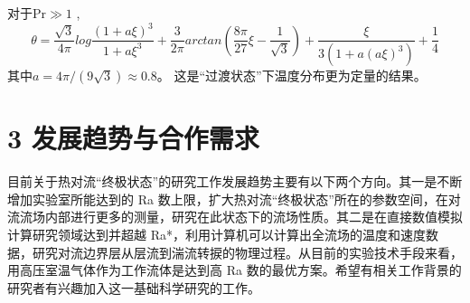 \documentclass[10pt,aps]{article}
\def\be{\begin{equation}}
\def\ee{\end{equation}}
\begin{document}
{对于Pr$\gg1$ ,
\be
\theta=\frac{\sqrt3}{4\pi}log\frac{(1+a\xi)^3}{1+{a\xi}^3}+\frac{3}{2\pi}arctan(\frac{8\pi}{27}\xi-\frac{1}{\sqrt3})+\frac{\xi}{3(1+a(a\xi)^3)}+\frac{1}{4}
\ee
其中$a=4\pi/(9\sqrt{3})\approx0.8$。
这是“过渡状态”下温度分布更为定量的结果。





\section*{3 发展趋势与合作需求}

目前关于热对流“终极状态”的研究工作发展趋势主要有以下两个方向。其一是不断增加实验室所能达到的 Ra 数上限，扩大热对流“终极状态”所在的参数空间，在对流流场内部进行更多的测量，研究在此状态下的流场性质。其二是在直接数值模拟计算研究领域达到并超越 Ra*，利用计算机可以计算出全流场的温度和速度数据，研究对流边界层从层流到湍流转捩的物理过程。从目前的实验技术手段来看，用高压室温气体作为工作流体是达到高 Ra 数的最优方案。希望有相关工作背景的研究者有兴趣加入这一基础科学研究的工作。








}
\end{document}
